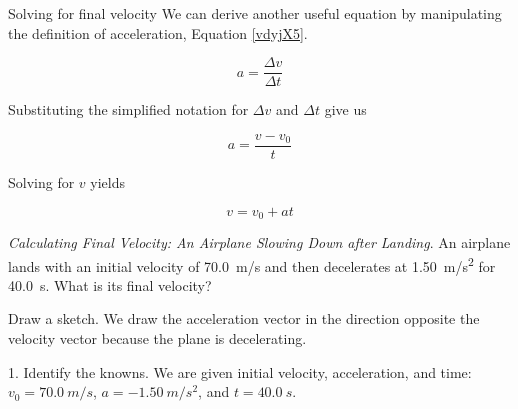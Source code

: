 \documentclass[../../main-ap-physics.tex]{subfiles}
\begin{document}
\begin{gradient}{Solving for final velocity} 
We can derive another useful equation by manipulating the definition of acceleration, Equation \eqref{vdyjX5}.

\begin{equation*}
    a = \frac{\Delta v}{\Delta t}
\end{equation*}

Substituting the simplified notation for $\Delta v$ and $\Delta t$ give us

\begin{equation*}
    a = \frac{v - v_0}{t}
\end{equation*}

Solving for $v$ yields

\begin{equation} \label{0bbOYZ}
    v = v_0 + a t
\end{equation}
\end{gradient}

\begin{example}
    \textit{Calculating Final Velocity: An Airplane Slowing Down after Landing}. An airplane lands with an initial velocity of \SI{70.0}{m/s} and then decelerates at \SI{1.50}{m/s^2} for \SI{40.0}{s}. What is its final velocity?
\end{example}

\Solution Draw a sketch. We draw the acceleration vector in the direction opposite the velocity vector because the plane is decelerating.


\begin{center}
\end{center}

1. Identify the knowns. We are given initial velocity, acceleration, and time: $v_0 = \SI{70.0}{m/s}$, $a = -\SI{1.50}{m/s^2}$, and $t = \SI{40.0}{s}$. 

\vspace{1ex}
\end{document}
